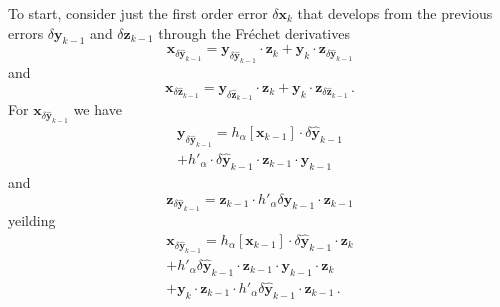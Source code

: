 \documentclass[letterpaper,twocolumn,amsmath,amsfont,amssymb,english,aps,jcp,preprintnumbers,groupaddress,nofootinbib,tightenlines]{revtex4}
\newcommand{\mat}[1]{\boldsymbol{#1}}
\begin{document}
To start, consider just the first order error $\delta \mat{x}_k$ that develops from the previous errors $\delta \mat{y}_{k-1}$
and $\delta \mat{z}_{k-1}$ through the Fr\'{e}chet derivatives \cite{}
\begin{equation}
  \mat{x}_{\delta \widehat{ \mat{y}}_{k-1}}
=   \mat{y}_{\delta \widehat{ \mat{y}}_{k-1}} \cdot \mat{z}_{k}  + \mat{y}_{k}  \cdot \mat{z}_{\delta \widehat{ \mat{y}}_{k-1}}
 \end{equation}
and
 \begin{equation}
 \mat{x}_{\delta \widehat{ \mat{z}}_{k-1}} =
\mat{y}_{\delta \widehat{ \mat{z}}_{k-1}} \cdot \mat{z}_{k}  + \mat{y}_{k}  \cdot \mat{z}_{\delta \widehat{ \mat{z}}_{k-1}} \, .
 \end{equation}
For $\mat{x}_{\delta \widehat{ \mat{y}}_{k-1}}$ we have
\begin{multline}
 \mat{y}_{\delta \widehat{ \mat{y}}_{k-1}} = h_\alpha \left[ \mat{x}_{k-1} \right] \cdot \delta \widehat{\mat{y}}_{k-1} \\
                                     + h'_\alpha \cdot \delta \widehat{\mat{y}}_{k-1} \cdot \mat{z}_{k-1} \cdot \mat{y}_{k-1}
\end{multline}
and
\begin{equation}
 \mat{z}_{\delta \widehat{ \mat{y}}_{k-1}} =  \mat{z}_{k-1} \cdot h'_\alpha \delta \widehat{\mat{y}}_{k-1} \cdot \mat{z}_{k-1}
\end{equation}
yeilding
\begin{multline}
 \mat{x}_{\delta \widehat{ \mat{y}}_{k-1}} = h_\alpha \left[ \mat{x}_{k-1} \right]  \cdot \delta \widehat{\mat{y}}_{k-1} \cdot \mat{z}_{k} \\
+  h'_\alpha  \delta \widehat{\mat{y}}_{k-1} \cdot \mat{z}_{k-1} \cdot  \mat{y}_{k-1} \cdot  \mat{z}_{k} \\
+ \mat{y}_{k} \cdot \mat{z}_{k-1} \cdot h'_\alpha \delta \widehat{\mat{y}}_{k-1} \cdot \mat{z}_{k-1}  \, .
\end{multline}
\end{document}
